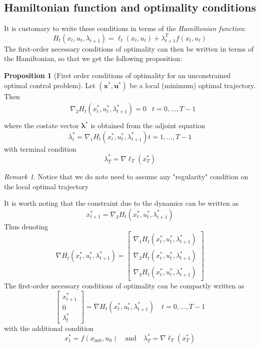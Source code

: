 \documentclass[openany]{book}
\theoremstyle{definition}
\newtheorem{proposition}{Proposition}[section] %
\theoremstyle{remark}
\newtheorem*{remark}{Remark} %
\begin{document}
\subsection{Hamiltonian function and optimality conditions}
It is customary to write these conditions in terms of the \emph{Hamiltonian function}: 
\[
    H_t(x_t,u_t,\lambda_{t+1}) = \ell_t(x_t,u_t) + \lambda_{t+1}^T f(x_t,u_t)
\]
The first-order necessary conditions of optimality can then be written in terms of the Hamiltonian, so that we get the following proposition:
\begin{proposition}[First order conditions of optimality for an unconstrained optimal control problem]
    Let $(\mathbf{x}^*,\mathbf{u}^*)$ be a local (minimum) optimal trajectory. Then 
    \begin{align*}
        &\nabla_2 H_t(x_t^*,u_t^*,\lambda_{t+1}^*) = 0 &t = 0,\dots,T-1\\
    \end{align*}
    where the costate vector $\boldsymbol{\lambda}^*$ is obtained from the adjoint equation 
    \[
        \lambda_t^* = \nabla_1 H_t(x_t^*,u_t^*,\lambda_{t+1}^*)  t=1,\dots,T-1
    \]
    with terminal condition
    \[
        \lambda_T^* = \nabla\ell_T(x_T^*)
    \]
\end{proposition}
\begin{remark}
    Notice that we do note need to assume any "regularity" condition on the local optimal trajectory
\end{remark}
It is worth noting that the constraint due to the dynamics can be written as 
\[
    x_{t+1}^* = \nabla_3H_t(x_t^*,u_t^*,\lambda_{t+1}^*)
\]
Thus denoting
\[
    \nabla H_t(x_t^*,u_t^*,\lambda_{t+1}^*) = \begin{bmatrix}
        \nabla_1 H_t(x_t^*,u_t^*,\lambda_{t+1}^*)\\
        \nabla_2 H_t(x_t^*,u_t^*,\lambda_{t+1}^*)\\
        \nabla_3 H_t(x_t^*,u_t^*,\lambda_{t+1}^*)
    \end{bmatrix}
\]
The first-order necessary conditions of optimality can be compactly written as 
\[
    \begin{bmatrix}
        x_{t+1}^* \\ 0 \\ \lambda_t^* 
    \end{bmatrix}  = \nabla H_t(x_t^*,u_t^*,\lambda_{t+1}^*) \quad t=0,\dots,T-1
\]
with the additional condition
\[
    x_1^* = f(x_{\text{init}},u_0) \quad \text{and} \quad \lambda_T^* = \nabla\ell_T(x_T^*)
\]
\end{document}
